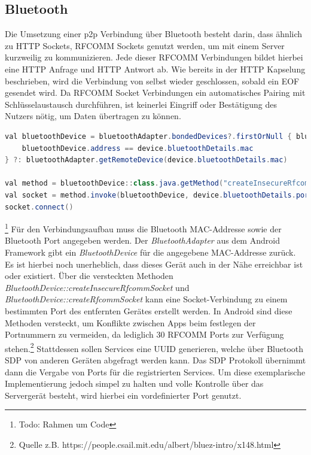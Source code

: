 \documentclass[12pt,a4paper]{article}
\begin{document}
        \subsection{Bluetooth}
        Die Umsetzung einer p2p Verbindung über Bluetooth besteht darin, dass ähnlich zu HTTP Sockets, RFCOMM Sockets genutzt werden, um mit einem Server kurzweilig zu kommunizieren. Jede dieser RFCOMM Verbindungen bildet hierbei eine HTTP Anfrage und HTTP Antwort ab. Wie bereits in der HTTP Kapselung beschrieben, wird die Verbindung von selbst wieder geschlossen, sobald ein EOF gesendet wird. Da RFCOMM Socket Verbindungen ein automatisches Pairing mit Schlüsselaustausch durchführen, ist keinerlei Eingriff oder Bestätigung des Nutzers nötig, um Daten übertragen zu können.
        \begin{lstlisting}[language=Java, caption=Verbindungsaufbau mit Bluetooth (Client: Kotlin)]
val bluetoothDevice = bluetoothAdapter.bondedDevices?.firstOrNull { bluetoothDevice ->
    bluetoothDevice.address == device.bluetoothDetails.mac
} ?: bluetoothAdapter.getRemoteDevice(device.bluetoothDetails.mac)

val method = bluetoothDevice::class.java.getMethod("createInsecureRfcommSocket", Int::class.javaPrimitiveType)
val socket = method.invoke(bluetoothDevice, device.bluetoothDetails.port) as BluetoothSocket
socket.connect()
        \end{lstlisting}\footnote{Todo: Rahmen um Code}
        Für den Verbindungsaufbau muss die Bluetooth MAC-Addresse sowie der Bluetooth Port angegeben werden. Der {\it BluetoothAdapter} aus dem Android Framework gibt ein {\it BluetoothDevice} für die angegebene MAC-Addresse zurück. Es ist hierbei noch unerheblich, dass dieses Gerät auch in der Nähe erreichbar ist oder existiert. Über die versteckten Methoden {\it BluetoothDevice::createInsecureRfcommSocket} und {\it BluetoothDevice::createRfcommSocket} kann eine Socket-Verbindung zu einem bestimmten Port des entfernten Gerätes erstellt werden. In Android sind diese Methoden versteckt, um Konflikte zwischen Apps beim festlegen der Portnummern zu vermeiden, da lediglich 30 RFCOMM Ports zur Verfügung stehen.\footnote{Quelle z.B. https://people.csail.mit.edu/albert/bluez-intro/x148.html} Stattdessen sollen Services eine UUID generieren, welche über Bluetooth SDP von anderen Geräten abgefragt werden kann. Das SDP Protokoll übernimmt dann die Vergabe von Ports für die registrierten Services. Um diese exemplarische Implementierung jedoch simpel zu halten und volle Kontrolle über das Servergerät besteht, wird hierbei ein vordefinierter Port genutzt.
\end{document}
